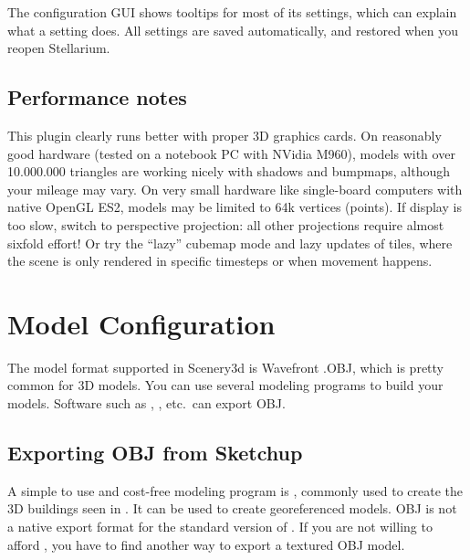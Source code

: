 The configuration GUI shows tooltips for most of its settings, which can explain
what a setting does. All settings are saved automatically, and restored when you
reopen Stellarium.


\subsection{Performance notes}
\label{sec:scenery3d:Performance}

This plugin clearly runs better with proper 3D graphics cards. 
On reasonably good hardware 
(tested on a notebook PC with NVidia M960), models with over 10.000.000 triangles 
are working nicely with shadows and bumpmaps, although your mileage may vary.  On very small
hardware like single-board computers with native OpenGL ES2, models
may be limited to 64k vertices (points).  If display is too slow,
switch to perspective projection: all other projections require almost
sixfold effort!  Or try the ``lazy'' cubemap mode and lazy updates of tiles, 
where the scene is only rendered in specific timesteps or
when movement happens.  


\section{Model Configuration}
\label{sec:scenery3d:ModelConfiguration}

The model format supported in Scenery3d is Wavefront .OBJ, which is
pretty common for 3D models.  You can use several modeling programs to
build your models. Software such as , ,  etc.\ can export OBJ. 

\subsection{Exporting OBJ from Sketchup}
\label{sec:scenery3d:sketchup}

A simple to use and cost-free modeling program is , commonly
used to create the 3D buildings seen in . It can be used
to create georeferenced models.  OBJ is not a native export format for
the standard version of . If you are not willing to
afford , you have to find another way to export a textured
OBJ model.


